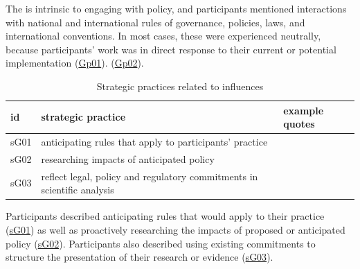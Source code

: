 The \skipoli{} is intrinsic to engaging with policy, and participants mentioned interactions with national and international rules of governance, policies, laws, and international conventions. In most cases, these were experienced neutrally, because participants' work was in direct response to their current or potential implementation (\hyperref[tab:resskipoli]{Gp01}).  (\hyperref[tab:resskipoli]{Gp02}).

\begin{table}[!ht]
\footnotesize
\caption{Strategic practices related to \skipoli{} influences}\label{tab:resskipolistrat}
\begin{tabular}{L{.06\linewidth}L{.3\linewidth}L{.64\linewidth}} \hline
\textbf{id} & \textbf{strategic practice} & \textbf{example quotes} \\ \hline \hline
sG01 & anticipating rules that apply to participants' practice &  \\ 
sG02 & researching impacts of anticipated policy &  \\ 
sG03 & reflect legal, policy and regulatory commitments in scientific analysis &  \\ 
\hline
 \end{tabular}
\end{table}

Participants described anticipating rules that would apply to their practice (\hyperref[tab:resskipolistrat]{sG01}) as well as proactively researching the impacts of proposed or anticipated policy (\hyperref[tab:resskipolistrat]{sG02}). Participants also described using existing commitments to structure the presentation of their research or evidence (\hyperref[tab:resskipolistrat]{sG03}).

\subsection{\titinst}\label{sec:resskiinst}

